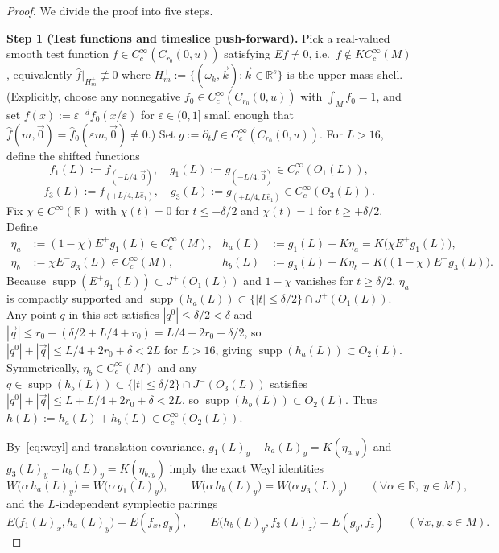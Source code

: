 \documentclass[11pt,a4paper]{article}
\theoremstyle{definition}
\theoremstyle{remark}
\newcommand{\RR}{\mathbb{R}}
\newcommand{\supp}{\operatorname{supp}}
\begin{document}
\begin{proof}
We divide the proof into five steps.

\medskip\noindent\textbf{Step 1 (Test functions and timeslice push-forward).}
Pick a real-valued smooth test function $f\in C_c^\infty(C_{r_0}(0,u))$ satisfying $Ef \neq 0$, i.e.\ $f\notin K C_c^\infty(M)$, equivalently $\widehat{f}|_{H_m^+}\not\equiv 0$ where $H_m^+ := \{(\omega_k,\vec{k}) : \vec{k}\in\RR^s\}$ is the upper mass shell. (Explicitly, choose any nonnegative $f_0\in C_c^\infty(C_{r_0}(0,u))$ with $\int_M f_0 = 1$, and set $f(x) := \varepsilon^{-d}f_0(x/\varepsilon)$ for $\varepsilon\in(0,1]$ small enough that $\widehat{f}(m,\vec{0}) = \widehat{f}_0(\varepsilon m,\vec{0}) \neq 0$.) Set $g := \partial_t f \in C_c^\infty(C_{r_0}(0,u))$. For $L > 16$, define the shifted functions
\[
f_1(L) := f_{(-L/4,\vec{0})}, \quad g_1(L) := g_{(-L/4,\vec{0})} \in C_c^\infty(O_1(L)),
\]
\[
f_3(L) := f_{(+L/4,L\hat{e}_1)}, \quad g_3(L) := g_{(+L/4,L\hat{e}_1)} \in C_c^\infty(O_3(L)).
\]
Fix $\chi\in C^\infty(\RR)$ with $\chi(t) = 0$ for $t\le -\delta/2$ and $\chi(t) = 1$ for $t\ge +\delta/2$. Define
\begin{align*}
\eta_a &:= (1-\chi) E^+ g_1(L) \in C_c^\infty(M), &
h_a(L) &:= g_1(L) - K\eta_a = K\bigl(\chi E^+ g_1(L)\bigr), \\
\eta_b &:= \chi E^- g_3(L) \in C_c^\infty(M), &
h_b(L) &:= g_3(L) - K\eta_b = K\bigl((1-\chi) E^- g_3(L)\bigr).
\end{align*}
Because $\supp(E^+ g_1(L)) \subset J^+(O_1(L))$ and $1-\chi$ vanishes for $t \ge \delta/2$, $\eta_a$ is compactly supported and $\supp(h_a(L)) \subset \{|t|\le \delta/2\}\cap J^+(O_1(L))$. Any point $q$ in this set satisfies $|q^0|\le \delta/2 < \delta$ and $|\vec{q}| \le r_0 + (\delta/2 + L/4 + r_0) = L/4 + 2r_0 + \delta/2$, so $|q^0|+|\vec{q}| \le L/4 + 2r_0 + \delta < 2L$ for $L > 16$, giving $\supp(h_a(L))\subset O_2(L)$. Symmetrically, $\eta_b\in C_c^\infty(M)$ and any $q\in\supp(h_b(L))\subset \{|t|\le \delta/2\}\cap J^-(O_3(L))$ satisfies $|q^0|+|\vec{q}| \le L + L/4 + 2r_0 + \delta < 2L$, so $\supp(h_b(L))\subset O_2(L)$. Thus $h(L) := h_a(L) + h_b(L) \in C_c^\infty(O_2(L))$.

By~\eqref{eq:weyl} and translation covariance, $g_1(L)_y - h_a(L)_y = K(\eta_{a,y})$ and $g_3(L)_y - h_b(L)_y = K(\eta_{b,y})$ imply the exact Weyl identities
\begin{equation}\label{eq:timeslice-id}
W\bigl(\alpha\,h_a(L)_y\bigr) = W\bigl(\alpha\,g_1(L)_y\bigr), \qquad
W\bigl(\alpha\,h_b(L)_y\bigr) = W\bigl(\alpha\,g_3(L)_y\bigr) \qquad (\forall \alpha\in\RR,\; y\in M),
\end{equation}
and the $L$-independent symplectic pairings
\[
E\bigl(f_1(L)_x, h_a(L)_y\bigr) = E(f_x, g_y), \qquad E\bigl(h_b(L)_y, f_3(L)_z\bigr) = E(g_y, f_z) \qquad (\forall x,y,z\in M).
\]


\end{proof}
\end{document}
